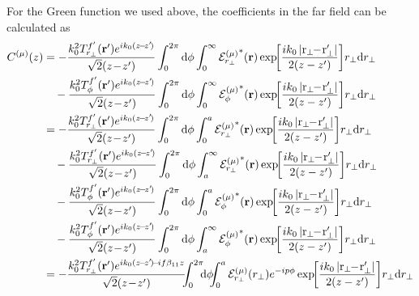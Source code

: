 For the Green function we used above, the coefficients in the far field can be calculated as
\begin{align}
C^{(\mu)} (z) &= - \frac{k_0^2 T^{f'}_{r_\perp}(\br') e^{ik_0(z\!-\!z'\!)}}{\sqrt{2}(z\!-\!z')}\int_0^{2\pi}\mathrm{d}\phi \int_0^\infty {\mathcal{E}^{(\mu)}_{r_\perp}}^* (\br) \exp\!\! \left[ \frac{ik_0 \left| \mathrm{r}_\perp\!\! -\! \mathrm{r}_\perp'\right|}{2(z-z')}  \right]\!  r_\perp \mathrm{d}r_\perp \nonumber\\
&\quad - \frac{k_0^2 T^{f'}_\phi(\br') e^{ik_0(z\!-\!z'\!)} }{\sqrt{2}(z\!-\!z')}\int_0^{2\pi}\mathrm{d}\phi \int_0^\infty {\mathcal{E}^{(\mu)}_\phi}^* (\br) \exp\!\! \left[ \frac{ik_0 \left| \mathrm{r}_\perp\!\! -\! \mathrm{r}_\perp'\right|}{2(z-z')}  \right]\!  r_\perp \mathrm{d}r_\perp \\
&=  - \frac{k_0^2 T^{f'}_{r_\perp}(\br') e^{ik_0(z\!-\!z'\!)}}{\sqrt{2}(z\!-\!z')}\int_0^{2\pi}\mathrm{d}\phi \int_0^a {\mathcal{E}^{(\mu)}_{r_\perp}}^* (\br) \exp\!\! \left[ \frac{ik_0 \left| \mathrm{r}_\perp\!\! -\! \mathrm{r}_\perp'\right|}{2(z-z')}  \right]\!  r_\perp \mathrm{d}r_\perp \nonumber\\
&\quad - \frac{k_0^2 T^{f'}_{r_\perp}(\br') e^{ik_0(z\!-\!z'\!)}}{\sqrt{2}(z\!-\!z')}\int_0^{2\pi}\mathrm{d}\phi \int_a^\infty {\mathcal{E}^{(\mu)}_{r_\perp}}^* (\br) \exp\!\! \left[ \frac{ik_0 \left| \mathrm{r}_\perp\!\! -\! \mathrm{r}_\perp'\right|}{2(z-z')}  \right]\!  r_\perp \mathrm{d}r_\perp \nonumber\\
&\quad - \frac{k_0^2 T^{f'}_\phi(\br') e^{ik_0(z\!-\!z'\!)}}{\sqrt{2}(z\!-\!z')}\int_0^{2\pi}\mathrm{d}\phi \int_0^a {\mathcal{E}^{(\mu)}_\phi}^* (\br) \exp\!\! \left[ \frac{ik_0 \left| \mathrm{r}_\perp\!\! -\! \mathrm{r}_\perp'\right|}{2(z-z')}  \right]\!  r_\perp \mathrm{d}r_\perp \nonumber\\
&\quad - \frac{k_0^2 T^{f'}_\phi(\br') e^{ik_0(z\!-\!z'\!)}}{\sqrt{2}(z\!-\!z')}\int_0^{2\pi}\mathrm{d}\phi \int_a^\infty {\mathcal{E}^{(\mu)}_\phi}^* (\br) \exp\!\! \left[ \frac{ik_0 \left| \mathrm{r}_\perp\!\! -\! \mathrm{r}_\perp'\right|}{2(z-z')}  \right]\!  r_\perp \mathrm{d}r_\perp \\
&= - \frac{k_0^2 T^{f'}_{r_\perp}(\br') e^{ik_0(z\!-\!z'\!)\!-\!if\beta_{11} z}}{\sqrt{2}(z\!-\!z')}  \!\!\! \int_0^{2\pi}\!\!\! \mathrm{d}\phi \!\!\! \int_0^a   \mathcal{E}^{(\mu)}_{r_\perp}(r_\perp) e^{-i p\phi} 
\exp\!\! \left[ \frac{ik_0 \left| \mathrm{r}_\perp\!\! -\! \mathrm{r}_\perp'\right|}{2(z-z')}  \right]\!  r_\perp \mathrm{d}r_\perp \nonumber\\

\end{align}
